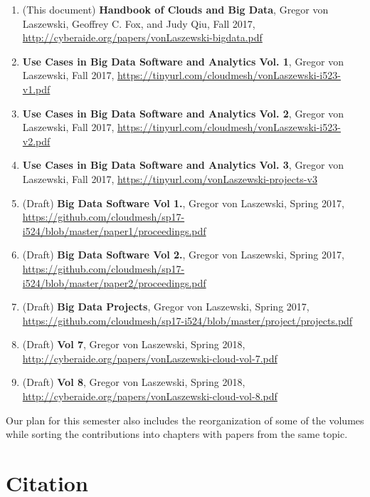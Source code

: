 \begin{enumerate}
\item (This document) {\bf Handbook of Clouds and Big Data}, Gregor von Laszewski,
  Geoffrey C. Fox, and Judy Qiu, Fall 2017,
  \url{http://cyberaide.org/papers/vonLaszewski-bigdata.pdf}

\item {\bf Use Cases in Big Data Software and
  Analytics Vol. 1}, Gregor von Laszewski, Fall 2017,
  \url{https://tinyurl.com/cloudmesh/vonLaszewski-i523-v1.pdf}

\item {\bf Use Cases in Big Data Software and
  Analytics Vol. 2}, Gregor von Laszewski, Fall 2017, 
  \url{https://tinyurl.com/cloudmesh/vonLaszewski-i523-v2.pdf}

\item  {\bf Use Cases in Big Data Software and
  Analytics Vol. 3}, Gregor von Laszewski, Fall 2017, 
  \url{https://tinyurl.com/vonLaszewski-projects-v3}

\item (Draft) {\bf Big Data Software Vol 1.}, Gregor von Laszewski, Spring 2017,
\url{https://github.com/cloudmesh/sp17-i524/blob/master/paper1/proceedings.pdf}

\item (Draft) {\bf Big Data Software Vol 2.}, Gregor von Laszewski, Spring 2017,
\url{https://github.com/cloudmesh/sp17-i524/blob/master/paper2/proceedings.pdf}

\item (Draft) {\bf Big Data Projects}, Gregor von Laszewski, Spring 2017,
\url{https://github.com/cloudmesh/sp17-i524/blob/master/project/projects.pdf}

\item (Draft) {\bf Vol 7}, Gregor von Laszewski, Spring 2018,
\url{http://cyberaide.org/papers/vonLaszewski-cloud-vol-7.pdf}

\item (Draft) {\bf Vol 8}, Gregor von Laszewski, Spring 2018,
\url{http://cyberaide.org/papers/vonLaszewski-cloud-vol-8.pdf}


\end{enumerate}

Our plan for this semester also includes the reorganization of some of
the volumes while sorting the contributions into chapters with papers
from the same topic.

\section{Citation}

